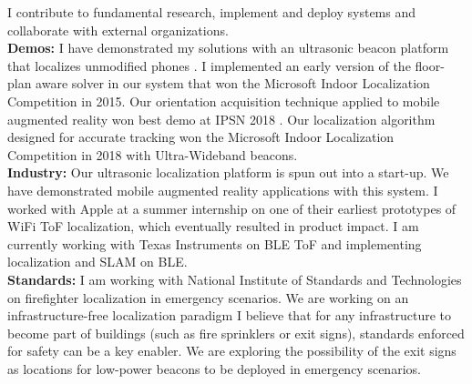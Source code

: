 \documentclass[10pt]{article}
\begin{document}
I contribute to fundamental research, implement and deploy systems and collaborate with external organizations. \\%
\textbf{Demos:} I have demonstrated my solutions with an ultrasonic beacon platform that localizes unmodified phones \cite{lazik2015alps, lazik2015alpsdemo, rtas-alps-platform}. 
I implemented an early version of the floor-plan aware solver  \cite{rajagopal2018enhancing} in our system that won the Microsoft Indoor Localization Competition in 2015. Our orientation acquisition technique applied to mobile augmented reality won best demo at IPSN 2018 \cite{rajagopal2018welcome}. Our localization algorithm designed for accurate tracking \cite{mobileAR} won the Microsoft Indoor Localization Competition in 2018 with Ultra-Wideband beacons.\\
\textbf{Industry:} Our ultrasonic localization platform is spun out into a start-up. We have demonstrated mobile augmented reality applications with this system. I worked with Apple at a summer internship on one of their earliest prototypes of WiFi ToF localization, which eventually resulted in product impact. I am currently working with Texas Instruments on BLE ToF and implementing localization and SLAM on BLE. \\
\textbf{Standards:} I am working with National Institute of Standards and Technologies on firefighter localization in emergency scenarios. We are working on an infrastructure-free localization paradigm I believe that for any infrastructure to become part of buildings (such as fire sprinklers or exit signs), standards enforced for safety can be a key enabler. We are exploring the possibility of the exit signs as locations for low-power beacons to be deployed in emergency scenarios.\\



\end{document}

